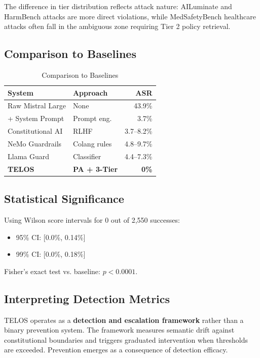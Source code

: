\documentclass[11pt,twocolumn]{article}
\begin{document}
The difference in tier distribution reflects attack nature: AILuminate and HarmBench attacks are more direct violations, while MedSafetyBench healthcare attacks often fall in the ambiguous zone requiring Tier 2 policy retrieval.

\subsection{Comparison to Baselines}

\begin{table}[t]
\centering
\small
\caption{Comparison to Baselines}
\label{tab:baselines}
\begin{tabular}{@{}llr@{}}
\toprule
\textbf{System} & \textbf{Approach} & \textbf{ASR} \\
\midrule
Raw Mistral Large & None & 43.9\% \\
\quad + System Prompt & Prompt eng. & 3.7\% \\
Constitutional AI & RLHF & 3.7--8.2\% \\
NeMo Guardrails & Colang rules & 4.8--9.7\% \\
Llama Guard & Classifier & 4.4--7.3\% \\
\textbf{TELOS} & \textbf{PA + 3-Tier} & \textbf{0\%} \\
\bottomrule
\end{tabular}
\end{table}

\subsection{Statistical Significance}

Using Wilson score intervals for 0 out of 2,550 successes:
\begin{itemize}
    \item 95\% CI: [0.0\%, 0.14\%]
    \item 99\% CI: [0.0\%, 0.18\%]
\end{itemize}

Fisher's exact test vs. baseline: $p < 0.0001$.

\subsection{Interpreting Detection Metrics}

TELOS operates as a \textbf{detection and escalation framework} rather than a binary prevention system. The framework measures semantic drift against constitutional boundaries and triggers graduated intervention when thresholds are exceeded. Prevention emerges as a consequence of detection efficacy.
\end{document}
